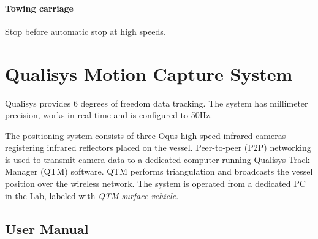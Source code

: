 \documentclass[a4paper,english]{report}
\begin{document}
\paragraph{Towing carriage}
Stop before automatic stop at high speeds.

\clearpage{}

\section{Qualisys Motion Capture System}
Qualisys provides 6 degrees of freedom data tracking. The system has millimeter precision, works in real time and is configured to 50Hz.

The positioning system consists of three Oqus high speed infrared cameras registering infrared reflectors placed on the vessel. Peer-to-peer (P2P) networking is used to transmit camera data to a dedicated computer running Qualisys Track Manager (QTM) software. QTM performs triangulation and broadcasts the vessel position over the wireless network. The system is operated from a dedicated PC in the Lab, labeled with \textit{QTM surface vehicle}. 

\subsection{User Manual}
\end{document}

